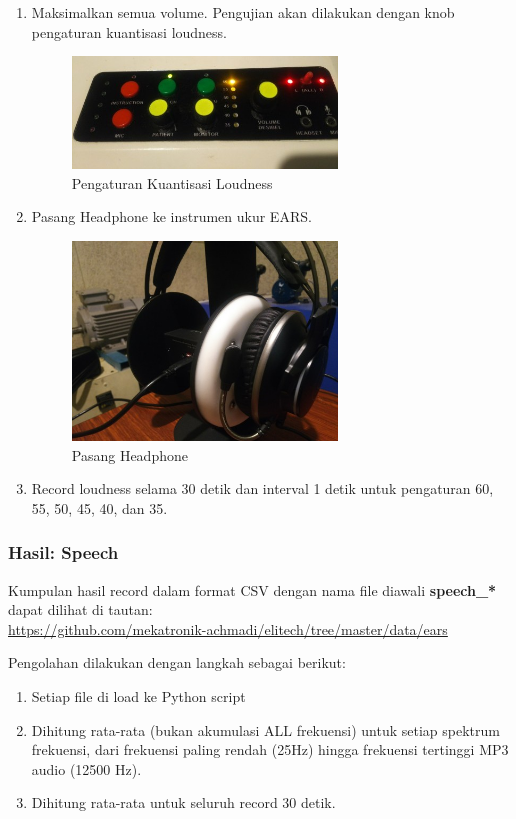 \documentclass[12pt,]{article}
\begin{document}
\begin{enumerate}
		\newpage
		\item Maksimalkan semua volume. Pengujian akan dilakukan dengan knob pengaturan kuantisasi loudness.

		\begin{figure}[!ht]
			\centering
			\includegraphics[width=200pt]{images/loudset}
			\caption{Pengaturan Kuantisasi Loudness}
		\end{figure}

		\item Pasang Headphone ke instrumen ukur EARS.

		\begin{figure}[!ht]
			\centering
			\includegraphics[width=200pt]{images/headphone}
			\caption{Pasang Headphone}
		\end{figure}

		\item Record loudness selama 30 detik dan interval 1 detik untuk pengaturan 60, 55, 50, 45, 40, dan 35.
	\end{enumerate}

	\subsubsection{Hasil: Speech}

	Kumpulan hasil record dalam format CSV dengan nama file diawali \textbf{speech\_*} dapat dilihat di tautan:\\
	\url{https://github.com/mekatronik-achmadi/elitech/tree/master/data/ears}

	Pengolahan dilakukan dengan langkah sebagai berikut:
	\begin{enumerate}
		\item Setiap file di load ke Python script
		\item Dihitung rata-rata (bukan akumulasi ALL frekuensi) untuk setiap spektrum frekuensi,
		dari frekuensi paling rendah (25Hz) hingga frekuensi tertinggi MP3 audio (12500 Hz).
		\item Dihitung rata-rata untuk seluruh record 30 detik.
	\end{enumerate}
\end{document}
